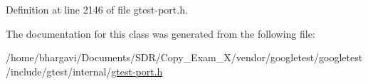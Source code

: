 Definition at line 2146 of file gtest-\/port.\+h.



The documentation for this class was generated from the following file\+:\begin{DoxyCompactItemize}
\item 
/home/bhargavi/\+Documents/\+S\+D\+R/\+Copy\+\_\+\+Exam\+\_\+X/vendor/googletest/googletest/include/gtest/internal/\hyperlink{gtest-port_8h}{gtest-\/port.\+h}\end{DoxyCompactItemize}
